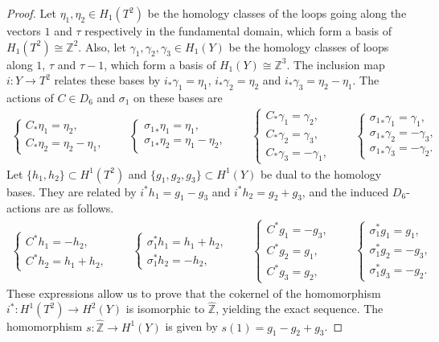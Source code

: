 \documentclass[pdftex]{sigma}
\theoremstyle{definition}
\newcommand{\Z}{\mathbb{Z}}
\begin{document}
\begin{proof}
Let $\eta_1, \eta_2 \in H_1(T^2)$ be the homology classes of the loops going along the vectors $1$ and $\tau$ respectively in the fundamental domain, which form a basis of $H_1(T^2) \cong \Z^2$. Also, let $\gamma_1, \gamma_2, \gamma_3 \in H_1(Y)$ be the homology classes of loops along $1$, $\tau$ and $\tau - 1$, which form a basis of $H_1(Y) \cong \Z^3$. The inclusion map $i\colon Y \to T^2$ relates these bases by $i_*\gamma_1 = \eta_1$, $i_*\gamma_2 = \eta_2$ and $i_*\gamma_3 = \eta_2 - \eta_1$. The actions of $C \in D_6$ and $\sigma_1$ on these bases are
\begin{gather*}
\begin{cases}
C_*\eta_1 = \eta_2, \\
C_*\eta_2 = \eta_2 - \eta_1,
\end{cases}
\qquad
\begin{cases}
{\sigma_1}_*\eta_1 = \eta_1, \\
{\sigma_1}_*\eta_2 = \eta_1 - \eta_2,
\end{cases}
\qquad
\begin{cases}
C_*\gamma_1 = \gamma_2, \\
C_*\gamma_2 = \gamma_3, \\
C_*\gamma_3 = - \gamma_1,
\end{cases}
\qquad
\begin{cases}
{\sigma_1}_*\gamma_1 = \gamma_1, \\
{\sigma_1}_*\gamma_2 = - \gamma_3, \\
{\sigma_1}_*\gamma_3 = - \gamma_2.
\end{cases}\!\!\!
\end{gather*}
Let $\{ h_1, h_2 \} \subset H^1(T^2)$ and $\{ g_1, g_2, g_3 \} \subset H^1(Y)$ be dual to the homology bases. They are related by $i^*h_1 = g_1 - g_3$ and $i^*h_2 = g_2 + g_3$, and the induced $D_6$-actions are as follows.
\begin{gather*}
\begin{cases}
C^*h_1 = - h_2, \\
C^*h_2 = h_1 + h_2,
\end{cases}\qquad
\begin{cases}
\sigma_1^*h_1 = h_1 + h_2, \\
\sigma_1^*h_2 = - h_2,
\end{cases}\qquad
\begin{cases}
C^*g_1 = - g_3, \\
C^*g_2 = g_1, \\
C^*g_3 = g_2,
\end{cases}\qquad
\begin{cases}
\sigma_1^*g_1 = g_1, \\
\sigma_1^*g_2 = - g_3, \\
\sigma_1^*g_3 = - g_2.
\end{cases}
\end{gather*}
These expressions allow us to prove that the cokernel of the homomorphism $i^* \colon H^1(T^2) \to H^2(Y)$ is isomorphic to $\hat{\Z}$, yielding the exact sequence. The homomorphism $s\colon \hat{\Z} \to H^1(Y)$ is given by $s(1) = g_1 - g_2 + g_3$.
\end{proof}
\end{document}
